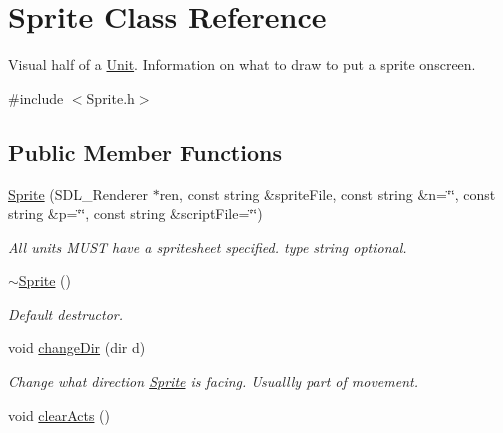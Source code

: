 \hypertarget{class_sprite}{}\section{Sprite Class Reference}
\label{class_sprite}


Visual half of a \hyperlink{class_unit}{Unit}. Information on what to draw to put a sprite onscreen.  




{\ttfamily \#include $<$Sprite.\+h$>$}

\subsection*{Public Member Functions}
\begin{DoxyCompactItemize}
\item 
\hyperlink{class_sprite_a1806d04dfca4c8989df24fd5436e4e78}{Sprite} (S\+D\+L\+\_\+\+Renderer $\ast$ren, const string \&sprite\+File, const string \&n=\char`\"{}\char`\"{}, const string \&p=\char`\"{}\char`\"{}, const string \&script\+File=\char`\"{}\char`\"{})\hypertarget{class_sprite_a1806d04dfca4c8989df24fd5436e4e78}{}\label{class_sprite_a1806d04dfca4c8989df24fd5436e4e78}

\begin{DoxyCompactList}\small\item\em All units M\+U\+ST have a spritesheet specified. type string optional. \end{DoxyCompactList}\item 
\hyperlink{class_sprite_a8accab430f9d90ae5117b57d67e32b84}{$\sim$\+Sprite} ()\hypertarget{class_sprite_a8accab430f9d90ae5117b57d67e32b84}{}\label{class_sprite_a8accab430f9d90ae5117b57d67e32b84}

\begin{DoxyCompactList}\small\item\em Default destructor. \end{DoxyCompactList}\item 
void \hyperlink{class_sprite_a3eadf6ba2634a886862b6e2d9ca93b17}{change\+Dir} (dir d)\hypertarget{class_sprite_a3eadf6ba2634a886862b6e2d9ca93b17}{}\label{class_sprite_a3eadf6ba2634a886862b6e2d9ca93b17}

\begin{DoxyCompactList}\small\item\em Change what direction \hyperlink{class_sprite}{Sprite} is facing. Usuallly part of movement. \end{DoxyCompactList}\item 
void \hyperlink{class_sprite_ad22d9f033c1414853cc3063ceae24598}{clear\+Acts} ()\hypertarget{class_sprite_ad22d9f033c1414853cc3063ceae24598}{}\label{class_sprite_ad22d9f033c1414853cc3063ceae24598}


\end{DoxyCompactItemize}
